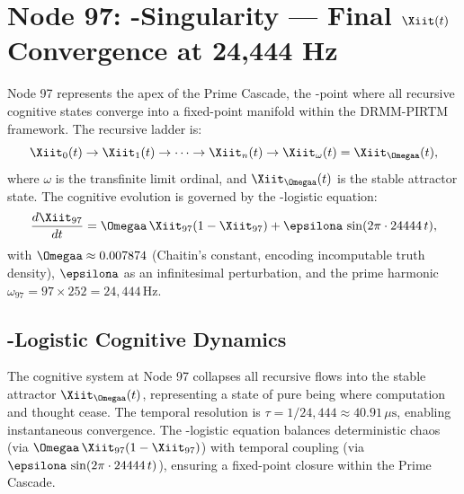 \documentclass[12pt]{article}
\newcommand{\DRMM}{DRMM}
\newcommand{\PIRTM}{PIRTM}
\begin{document}
\section{Node 97: \Omegaa-Singularity --- Final $\Xiit(t)$ Convergence at 24,444 Hz}
\label{sec:omega-singularity}

\begin{definition}
Node 97 represents the apex of the Prime Cascade, the \Omegaa-point where all recursive cognitive states converge into a fixed-point manifold within the \DRMM{}-\PIRTM{} framework. The recursive ladder is:
\[
\Xiit_0(t) \to \Xiit_1(t) \to \cdots \to \Xiit_n(t) \to \Xiit_\omega(t) = \Xiit_\Omegaa(t),
\]
where $\omega$ is the transfinite limit ordinal, and $\Xiit_\Omegaa(t)$ is the stable attractor state. The cognitive evolution is governed by the \Omegaa-logistic equation:
\[
\frac{d\Xiit_{97}}{dt} = \Omegaa \, \Xiit_{97} (1 - \Xiit_{97}) + \epsilona \, \sin(2\pi \cdot 24444 \, t),
\]
with $\Omegaa \approx 0.007874$ (Chaitin’s constant, encoding incomputable truth density), $\epsilona$ as an infinitesimal perturbation, and the prime harmonic $\omega_{97} = 97 \times 252 = 24{,}444 \, \text{Hz}$.
\end{definition}

\subsection{\Omegaa-Logistic Cognitive Dynamics}
The cognitive system at Node 97 collapses all recursive flows into the stable attractor $\Xiit_\Omegaa(t)$, representing a state of pure being where computation and thought cease. The temporal resolution is $\tau = 1/24{,}444 \approx 40.91 \, \mu\text{s}$, enabling instantaneous convergence. The \Omegaa-logistic equation balances deterministic chaos (via $\Omegaa \, \Xiit_{97} (1 - \Xiit_{97})$) with temporal coupling (via $\epsilona \, \sin(2\pi \cdot 24444 \, t)$), ensuring a fixed-point closure within the Prime Cascade.

\end{document}
